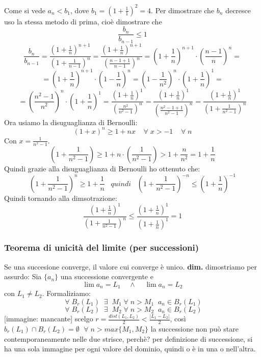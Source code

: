 \begin{itemize}
\[        \]
        Come si vede $a_n < b_1$, dove $b_1 = (1 + \frac{1}{1})^2 = 4$.\newline
        Per dimostrare che $b_n$ decresce uso la stessa metodo di prima, cioè dimostrare che
        \[
            \frac{b_n}{b_{n-1}} \leq 1
        \]
        \[
            \frac{b_n}{b_{n-1}} = \frac{(1+\frac{1}{n})^{n+1}}{(1+\frac{1}{n-1})^n} = \frac{(1+\frac{1}{n})^{n+1}}{(\frac{n-1+1}{n-1})^n} = (1+\frac{1}{n})^{n+1} \cdot  (\frac{n-1}{n})^n = 
        \]
        \[
            =(1+\frac{1}{n})^{n+1} \cdot (1-\frac{1}{n})^n = (1-\frac{1}{n^2})^n \cdot (1+\frac{1}{n})^1 = 
        \]
        \[
            = (\frac{n^2-1}{n^2})^n \cdot (1+\frac{1}{n})^1 = \frac{(1+\frac{1}{n})^1}{(\frac{n^2}{n^2-1})^n} = \frac{(1+\frac{1}{n})^1}{(\frac{n^2 -1+1}{n^2-1})^n} = \frac{(1+\frac{1}{n})^1}{(1 + \frac{1}{n^2-1})^n} 
        \]
        Ora usiamo la disuguaglianza di Bernoulli:
        \[
            (1+x)^n \geq 1 + nx \;\;\; \;\forall\;x > -1 \;\;\;\;\forall\;n
        \]
        Con $x = \frac{1}{n^x -1}$.\newline
        \[
             (1 + \frac{1}{n^2-1}) \geq 1 + n \cdot (\frac{1}{n^2-1}) > 1+ \frac{n}{n^2} = 1 + \frac{1}{n}
        \]
        Quindi grazie alla disuguaglianza di Bernoulli ho ottenuto che:
        \[
            (1 + \frac{1}{n^2-1})^n \geq 1 + \frac{1}{n} \;\;\;quindi \;\;\; (1 + \frac{1}{n^2-1})^{-n} \leq (1 + \frac{1}{n})^{-1}
        \]
        Quindi tornando alla dimsotrazione:
        \[
            \frac{(1+\frac{1}{n})^1}{(1 + \frac{1}{n^2-1})^n} \leq \frac{(1 + \frac{1}{n})^1}{(1 + \frac{1}{n})^1} = 1
        \]
\end{itemize}
\subsubsection*{Teorema di unicità del limite (per successioni)}
Se una succesione converge, il valore cui converge è unico.\newline
\textbf{dim.} dimostriamo per assurdo: \newline
Sia $\{a_n\}$ una successione convergente e 
\[
    \lim a_n = L_1 \;\;\;\; \land \;\;\;\; \lim a_n = L_2
\]
con $L_1 \neq L_2$.\newline
Formaliziamo:
\[
    \;\forall\;B_r(L_1) \;\;\exists\;\; M_1 \;\forall\;n> M_1 \;\;a_n \in B_r(L_1)
\]
\[
    \;\forall\;B_r(L_2) \;\;\exists\;\; M_2 \;\forall\;n> M_2 \;\;a_n \in B_r(L_2)
\]
[immagine: mancante]\newline
scelgo $r = \frac{dist(L_1, L_2)}{2} < \frac{|L_1-L_2|}{2}$, così $b_r(L_1)\cap B_r(L_2) = \emptyset$ \newline
$\;\forall\; n > max\{M_1, M_2\}$ la successione non può stare contemporaneamente nelle due strisce, perchè? per definizione di successione, si ha una sola immagine per ogni valore del dominio, quindi o è in una o nell'altra.
